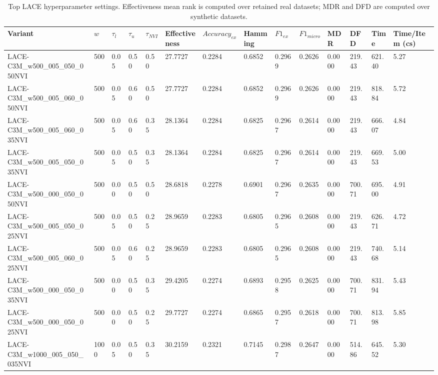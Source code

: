 \begin{table}
\caption{Top LACE hyperparameter settings. Effectiveness mean rank is computed over retained real datasets; MDR and DFD are computed over synthetic datasets.}
\label{tab:hyperparameter_selection}
\begin{tabular}{llllllllllllll}
\toprule
Variant & $w$ & $\tau_l$ & $\tau_u$ & $\tau_{NVI}$ & Effectiveness & $Accuracy_{ex}$ & Hamming & $F1_{ex}$ & $F1_{micro}$ & MDR & DFD & Time & Time/Item (cs) \\
\midrule
LACE-C3M\_w500\_005\_050\_050NVI & 500 & 0.05 & 0.50 & 0.50 & 27.7727 & 0.2284 & 0.6852 & 0.2969 & 0.2626 & 0.0000 & 219.43 & 621.40 & 5.27 \\
LACE-C3M\_w500\_005\_060\_050NVI & 500 & 0.05 & 0.60 & 0.50 & 27.7727 & 0.2284 & 0.6852 & 0.2969 & 0.2626 & 0.0000 & 219.43 & 818.84 & 5.72 \\
LACE-C3M\_w500\_005\_060\_035NVI & 500 & 0.05 & 0.60 & 0.35 & 28.1364 & 0.2284 & 0.6825 & 0.2967 & 0.2614 & 0.0000 & 219.43 & 666.07 & 4.84 \\
LACE-C3M\_w500\_005\_050\_035NVI & 500 & 0.05 & 0.50 & 0.35 & 28.1364 & 0.2284 & 0.6825 & 0.2967 & 0.2614 & 0.0000 & 219.43 & 669.53 & 5.00 \\
LACE-C3M\_w500\_000\_050\_050NVI & 500 & 0.00 & 0.50 & 0.50 & 28.6818 & 0.2278 & 0.6901 & 0.2967 & 0.2635 & 0.0000 & 700.71 & 695.00 & 4.91 \\
LACE-C3M\_w500\_005\_050\_025NVI & 500 & 0.05 & 0.50 & 0.25 & 28.9659 & 0.2283 & 0.6805 & 0.2965 & 0.2608 & 0.0000 & 219.43 & 626.71 & 4.72 \\
LACE-C3M\_w500\_005\_060\_025NVI & 500 & 0.05 & 0.60 & 0.25 & 28.9659 & 0.2283 & 0.6805 & 0.2965 & 0.2608 & 0.0000 & 219.43 & 740.68 & 5.14 \\
LACE-C3M\_w500\_000\_050\_035NVI & 500 & 0.00 & 0.50 & 0.35 & 29.4205 & 0.2274 & 0.6893 & 0.2958 & 0.2625 & 0.0000 & 700.71 & 831.94 & 5.43 \\
LACE-C3M\_w500\_000\_050\_025NVI & 500 & 0.00 & 0.50 & 0.25 & 29.7727 & 0.2274 & 0.6865 & 0.2957 & 0.2618 & 0.0000 & 700.71 & 813.98 & 5.85 \\
LACE-C3M\_w1000\_005\_050\_035NVI & 1000 & 0.05 & 0.50 & 0.35 & 30.2159 & 0.2321 & 0.7145 & 0.2987 & 0.2647 & 0.0000 & 514.86 & 645.52 & 5.30 \\
\bottomrule
\end{tabular}
\end{table}
